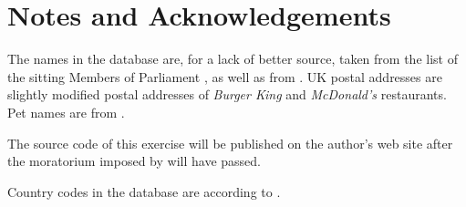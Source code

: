 \documentclass[10pt]{article}
\begin{document}
\section{Notes and Acknowledgements}
\thispagestyle{fancy}

The names in the database are, for a lack of better source, taken from the list of the sitting Members of Parliament \cite{mps}, as well as from \cite{minarcsys}.  UK postal addresses are slightly modified postal addresses of {\em Burger King} \cite{burgerking} and {\em McDonald's} \cite{mcdonalds} restaurants.  Pet names are from \cite{petnames}.


The source code of this exercise will be published on the author's web site after the moratorium imposed by \cite{plagiarism} will have passed.

Country codes in the database are according to \cite{iso3166}.


\pagebreak

\thispagestyle{fancy}
\end{document}
